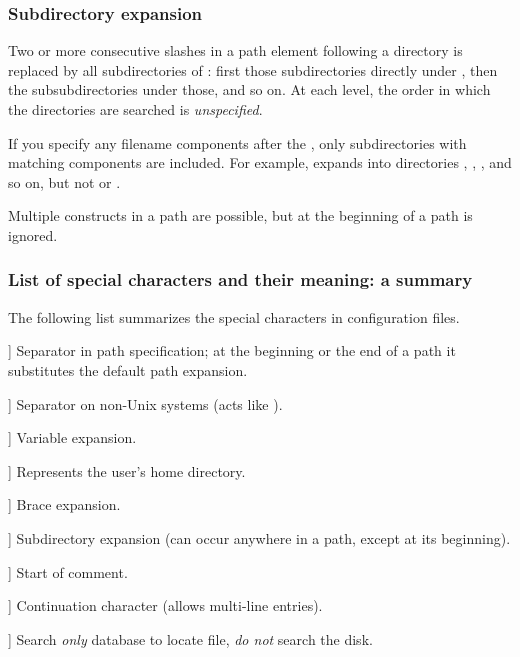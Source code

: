 \documentclass{article}
\begin{document}
\subsubsection{Subdirectory expansion}
\label{Subdirectory-expansion}

Two or more consecutive slashes in a path element following a directory
 is replaced by all subdirectories of : first those
subdirectories directly under , then the subsubdirectories under
those, and so on.  At each level, the order in which the directories are
searched is \emph{unspecified}.

If you specify any filename components after the \samp{//}, only
subdirectories with matching components are included.  For example,
 expands into directories , ,
, and so on, but not  or .

Multiple \samp{//} constructs in a path are possible, but
\samp{//} at the beginning of a path is ignored.

\subsubsection{List of special characters and their meaning: a summary}

The following list summarizes the special characters in \KPS{}
configuration files.

\newcommand{\CODE}[1]{\makebox[3em][l]{\code{#1}}}
\begin{ttdescription}
\item[\CODE{:}] Separator in path specification; at the beginning or
  the end of a path it substitutes the default path expansion.\par
\item[\CODE{;}] Separator on non-Unix systems (acts like \code{:}).
\item[\CODE{\$}] Variable expansion.
\item[\CODE{\string~}] Represents the user's home directory. 
\item[\CODE{\char`\{...\char`\}}] Brace expansion.
\item[\CODE{//}] Subdirectory expansion (can occur anywhere in
    a path, except at its beginning).
\item[\CODE{\%}] Start of comment.
\item[\CODE{\bs}] Continuation character (allows multi-line entries).
\item[\CODE{!!}] Search \emph{only} database to locate file, \emph{do
    not} search the disk.
\end{ttdescription}
\end{document}
